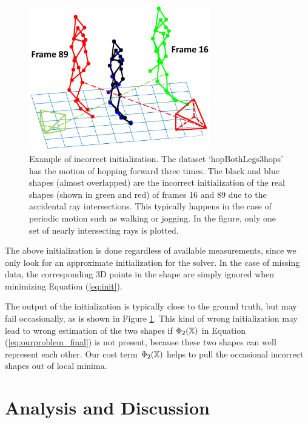 \begin{figure}
\centering
\includegraphics[width=0.70\textwidth]{chapter5/resource/wrong_init.pdf}
\caption[Example of incorrect initialization.]{Example of incorrect initialization. The dataset `hopBothLegs3hops' \cite{cg-2007-2} has the motion of hopping forward three times. The black and blue shapes (almost overlapped) are the incorrect initialization of the real shapes (shown in green and red) of frames 16 and 89 due to the accidental ray intersections. This typically happens in the case of  periodic motion such as walking or jogging. In the figure, only one set of nearly intersecting rays is plotted.}
\label{fig:init}
\end{figure}

The above initialization is done regardless of available measurements, since we only look for an approximate initialization for the solver. In the case of missing data, the corresponding 3D points in the shape are simply ignored when minimizing Equation (\ref{eq:init}).

The output of the initialization is typically close to the ground truth, but may fail occasionally, as is shown in Figure \ref{fig:init}. This kind of wrong initialization may lead to wrong estimation of the two shapes if $\Phi_2(\mathbb X)$ in Equation (\ref{eq:ourproblem_final}) is not present, because these two shapes can well represent each other. Our cost term $\Phi_2(\mathbb X)$ helps to pull the occasional incorrect shapes out of local minima.



\section{Analysis and Discussion}	\label{sec:reconstructability}

